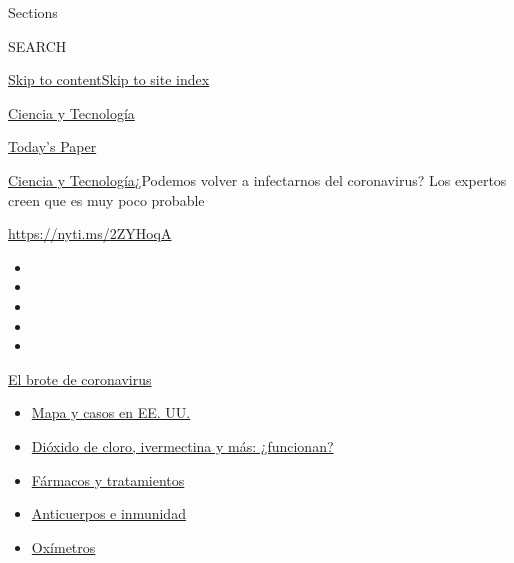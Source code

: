 Sections

SEARCH

\protect\hyperlink{site-content}{Skip to
content}\protect\hyperlink{site-index}{Skip to site index}

\href{https://www.nytimes3xbfgragh.onion/es/section/ciencia-y-tecnologia}{Ciencia
y Tecnología}

\href{https://myaccount.nytimes3xbfgragh.onion/auth/login?response_type=cookie\&client_id=vi}{}

\href{https://www.nytimes3xbfgragh.onion/section/todayspaper}{Today's
Paper}

\href{/es/section/ciencia-y-tecnologia}{Ciencia y
Tecnología}\textbar{}¿Podemos volver a infectarnos del coronavirus? Los
expertos creen que es muy poco probable

\url{https://nyti.ms/2ZYHoqA}

\begin{itemize}
\item
\item
\item
\item
\item
\end{itemize}

\href{https://www.nytimes3xbfgragh.onion/es/spotlight/coronavirus?action=click\&pgtype=Article\&state=default\&region=TOP_BANNER\&context=storylines_menu}{El
brote de coronavirus}

\begin{itemize}
\tightlist
\item
  \href{https://www.nytimes3xbfgragh.onion/es/interactive/2020/espanol/mundo/coronavirus-en-estados-unidos.html?action=click\&pgtype=Article\&state=default\&region=TOP_BANNER\&context=storylines_menu}{Mapa
  y casos en EE. UU.}
\item
  \href{https://www.nytimes3xbfgragh.onion/es/2020/07/23/espanol/america-latina/bolivia-cloro-coronavirus-ivermectina.html?action=click\&pgtype=Article\&state=default\&region=TOP_BANNER\&context=storylines_menu}{Dióxido
  de cloro, ivermectina y más: ¿funcionan?}
\item
  \href{https://www.nytimes3xbfgragh.onion/es/interactive/2020/science/coronavirus-tratamientos-curas.html?action=click\&pgtype=Article\&state=default\&region=TOP_BANNER\&context=storylines_menu}{Fármacos
  y tratamientos}
\item
  \href{https://www.nytimes3xbfgragh.onion/es/2020/07/28/espanol/ciencia-y-tecnologia/anticuerpos-coronavirus-inmunidad.html?action=click\&pgtype=Article\&state=default\&region=TOP_BANNER\&context=storylines_menu}{Anticuerpos
  e inmunidad}
\item
  \href{https://www.nytimes3xbfgragh.onion/es/2020/04/29/espanol/estilos-de-vida/oximetro-para-que-sirve.html?action=click\&pgtype=Article\&state=default\&region=TOP_BANNER\&context=storylines_menu}{Oxímetros}
\end{itemize}

